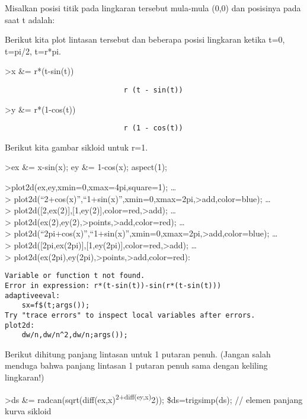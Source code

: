 \documentclass[
]{book}
\begin{document}
Misalkan posisi titik pada lingkaran tersebut mula-mula (0,0) dan posisinya pada saat t adalah:

Berikut kita plot lintasan tersebut dan beberapa posisi lingkaran ketika t=0, t=pi/2, t=r*pi.

\textgreater x \&= r*(t-sin(t))

\begin{verbatim}
                            r (t - sin(t))
\end{verbatim}

\textgreater y \&= r*(1-cos(t))

\begin{verbatim}
                            r (1 - cos(t))
\end{verbatim}

Berikut kita gambar sikloid untuk r=1.

\textgreater ex \&= x-sin(x); ey \&= 1-cos(x); aspect(1);

\textgreater plot2d(ex,ey,xmin=0,xmax=4pi,square=1); \ldots{}\\
\textgreater{} plot2d(``2+cos(x)'',``1+sin(x)'',xmin=0,xmax=2pi,\textgreater add,color=blue); \ldots{}\\
\textgreater{} plot2d({[}2,ex(2){]},{[}1,ey(2){]},color=red,\textgreater add); \ldots{}\\
\textgreater{} plot2d(ex(2),ey(2),\textgreater points,\textgreater add,color=red); \ldots{}\\
\textgreater{} plot2d(``2pi+cos(x)'',``1+sin(x)'',xmin=0,xmax=2pi,\textgreater add,color=blue); \ldots{}\\
\textgreater{} plot2d({[}2pi,ex(2pi){]},{[}1,ey(2pi){]},color=red,\textgreater add); \ldots{}\\
\textgreater{} plot2d(ex(2pi),ey(2pi),\textgreater points,\textgreater add,color=red):

\begin{verbatim}
Variable or function t not found.
Error in expression: r*(t-sin(t))-sin(r*(t-sin(t)))
adaptiveeval:
    sx=f$(t;args());
Try "trace errors" to inspect local variables after errors.
plot2d:
    dw/n,dw/n^2,dw/n;args());
\end{verbatim}

Berikut dihitung panjang lintasan untuk 1 putaran penuh. (Jangan salah menduga bahwa panjang lintasan 1 putaran penuh sama dengan keliling lingkaran!)

\textgreater ds \&= radcan(sqrt(diff(ex,x)\textsuperscript{2+diff(ey,x)}2)); \$ds=trigsimp(ds); // elemen panjang kurva sikloid
\end{document}
